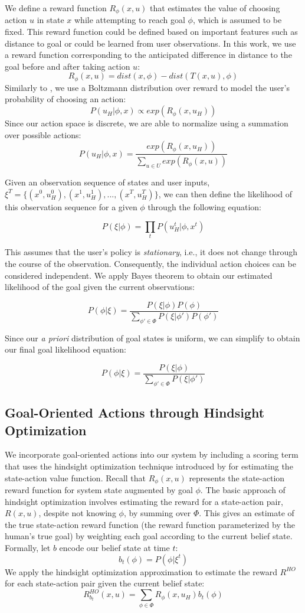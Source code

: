 \documentclass[conference]{IEEEtran}
\begin{document}
We define a reward function $R_\phi (x, u)$ that estimates the value of choosing action $u$ in state $x$ while attempting to reach goal $\phi$, which is assumed to be fixed. This reward function could be defined based on important features such as distance to goal or could be learned from user observations. In this work, we use a reward function corresponding to the anticipated difference in distance to the goal before and after taking action $u$:
\[
R_\phi (x, u) = dist(x, \phi) - dist(T(x, u), \phi)
\]
Similarly to \citet{ramachandran2007bayesian}, we use a Boltzmann distribution over reward to model the user's probability of choosing an action:
\[
P(u_H|\phi, x) \propto exp(R_\phi (x, u_H))
\]
Since our action space is discrete, we are able to normalize using a summation over possible actions:
\[
P(u_H|\phi, x) = \frac{exp(R_\phi (x, u_H))}{\sum_{u \in U} exp(R_\phi (x, u))}
\]

Given an observation sequence of states and user inputs, $\xi^T = \{(x^0, u_H^0), (x^1, u_H^1), ..., (x^T, u_H^T)\}$, we can then define the likelihood of this observation sequence for a given $\phi$ through the following equation:

\[
P(\xi|\phi) = \prod_tP(u_H^t|\phi, x^t)
\]

This assumes that the user's policy is \textit{stationary}, i.e., it does not change through the course of the observation. Consequently, the individual action choices can be considered independent. We apply Bayes theorem to obtain our estimated likelihood of the goal given the current observations:

\[
P(\phi|\xi) = \frac{P(\xi|\phi)P(\phi)}{\sum_{\phi' \in \Phi}P(\xi|\phi')P(\phi')}
\]

Since our \textit{a priori} distribution of goal states is uniform, we can simplify to obtain our final goal likelihood equation:

\[
P(\phi|\xi) = \frac{P(\xi|\phi)}{\sum_{\phi' \in \Phi}P(\xi|\phi')}
\]

\subsection{Goal-Oriented Actions through Hindsight Optimization}

We incorporate goal-oriented actions into our system by including a scoring term that uses the hindsight optimization technique introduced by \citet{javdani2015shared} for estimating the state-action value function. Recall that $R_\phi(x, u)$ represents the state-action reward function for system state augmented by goal $\phi$. The basic approach of hindsight optimization involves estimating the reward for a state-action pair, $R(x, u)$, despite not knowing $\phi$, by summing over $\Phi$. This gives an estimate of the true state-action reward function (the reward function parameterized by the human's true goal) by weighting each goal according to the current belief state. Formally, let $b$ encode our belief state at time $t$:
\[
b_t(\phi) = P(\phi|\xi^t)
\]
We apply the hindsight optimization approximation to estimate the reward $R^{HO}$ for each state-action pair given the current belief state:
\[
R^{HO}_{b_t}(x,u) = \sum_{\phi \in \Phi} R_\phi (x, u_H)b_t(\phi)
\]
\end{document}
